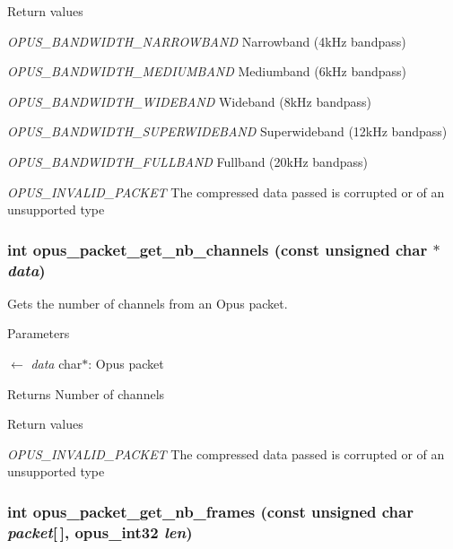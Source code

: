 \begin{DoxyRetVals}{Return values}
\item[{\em OPUS\_\-BANDWIDTH\_\-NARROWBAND}]Narrowband (4kHz bandpass) \item[{\em OPUS\_\-BANDWIDTH\_\-MEDIUMBAND}]Mediumband (6kHz bandpass) \item[{\em OPUS\_\-BANDWIDTH\_\-WIDEBAND}]Wideband (8kHz bandpass) \item[{\em OPUS\_\-BANDWIDTH\_\-SUPERWIDEBAND}]Superwideband (12kHz bandpass) \item[{\em OPUS\_\-BANDWIDTH\_\-FULLBAND}]Fullband (20kHz bandpass) \item[{\em OPUS\_\-INVALID\_\-PACKET}]The compressed data passed is corrupted or of an unsupported type \end{DoxyRetVals}
\hypertarget{group__opus__decoder_ga4209376ddf8cc3379767e1749e1ef26d}{
\subsubsection[{opus\_\-packet\_\-get\_\-nb\_\-channels}]{\setlength{\rightskip}{0pt plus 5cm}int opus\_\-packet\_\-get\_\-nb\_\-channels (const unsigned char $\ast$ {\em data})}}
\label{group__opus__decoder_ga4209376ddf8cc3379767e1749e1ef26d}


Gets the number of channels from an Opus packet. 
\begin{DoxyParams}{Parameters}
\item[\mbox{$\leftarrow$} {\em data}]{\ttfamily char$\ast$}: Opus packet \end{DoxyParams}
\begin{DoxyReturn}{Returns}
Number of channels 
\end{DoxyReturn}

\begin{DoxyRetVals}{Return values}
\item[{\em OPUS\_\-INVALID\_\-PACKET}]The compressed data passed is corrupted or of an unsupported type \end{DoxyRetVals}
\hypertarget{group__opus__decoder_ga064cb2ed9e77a934cd7db6c13b02c584}{
\subsubsection[{opus\_\-packet\_\-get\_\-nb\_\-frames}]{\setlength{\rightskip}{0pt plus 5cm}int opus\_\-packet\_\-get\_\-nb\_\-frames (const unsigned char {\em packet}\mbox{[}$\,$\mbox{]}, \/  {\bf opus\_\-int32} {\em len})}}
\label{group__opus__decoder_ga064cb2ed9e77a934cd7db6c13b02c584}


